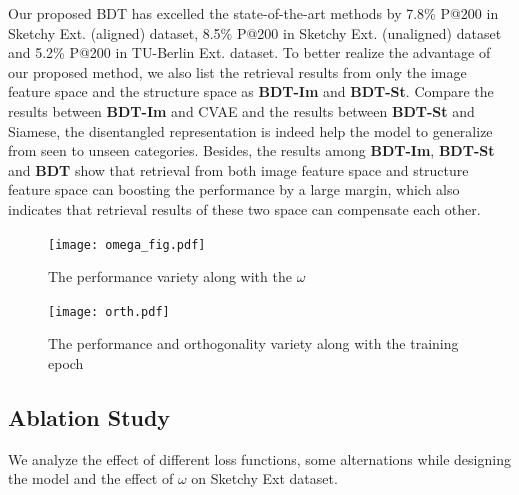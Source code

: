 \documentclass[10pt,twocolumn,letterpaper]{article}
\begin{document}
Our proposed BDT has excelled the state-of-the-art methods by 7.8\% P@200 in Sketchy Ext. (aligned) dataset, 8.5\% P@200 in Sketchy Ext. (unaligned) dataset and 5.2\% P@200 in TU-Berlin Ext. dataset. 
To better realize the advantage of our proposed method, we also list the retrieval results from only the image feature space and the structure space as \textbf{BDT-Im} and \textbf{BDT-St}. Compare the results between \textbf{BDT-Im} and CVAE and the results between \textbf{BDT-St} and Siamese, the disentangled representation is indeed help the model to generalize from seen to unseen categories. 
Besides, the results among \textbf{BDT-Im}, \textbf{BDT-St} and \textbf{BDT} show that retrieval from both image feature space and structure feature space can boosting the performance by a large margin, which also indicates that retrieval results of these two space can compensate each other.

\begin{figure}
\begin{center}
\texttt{[image: omega\_fig.pdf]}
\end{center}
   \caption{The performance variety along with the $\omega$}
\label{fig:omega}
\end{figure}

\begin{figure}
\begin{center}
\texttt{[image: orth.pdf]}
\end{center}
   \caption{The performance and orthogonality variety along with the training epoch}
\label{fig:orth}
\end{figure}




\subsection{Ablation Study}
We analyze the effect of different loss functions, some alternations while designing the model and the effect of $\omega$ on Sketchy Ext dataset.
\end{document}
